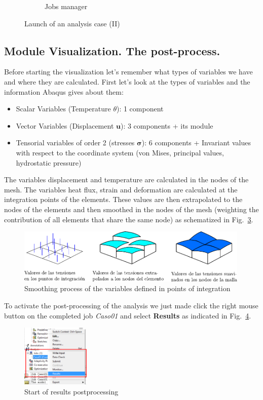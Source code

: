\begin{enumerate}
\begin{figure}[H]
\begin{subfigure}{0.49\textwidth}
      \caption{Jobs manager}
      \label{figu68}
    \end{subfigure}%
    \caption{Launch of an analysis case (II)}
  \end{figure}
\end{enumerate}
\newpage
\subsection{Module Visualization. The post-process.}

Before starting the visualization let's remember what types of
variables we have and where they are calculated. First let's look at
the types of variables and the information Abaqus gives about them:
\begin{itemize}
\item Scalar Variables (Temperature $\theta$): 1 component
\item Vector Variables (Displacement $\mathbf{u}$): 3 components + its
  module
\item Tensorial variables of order 2 (stresses $\bm{\sigma}$): 6
  components + Invariant values with respect to the coordinate system
  (von Mises, principal values, hydrostatic pressure)
\end{itemize}

The variables displacement and temperature are calculated in the nodes
of the mesh. The variables heat flux, strain and deformation are
calculated at the integration points of the elements. These values
are then extrapolated to the nodes of the elements and then smoothed
in the nodes of the mesh (weighting the contribution of all elements
that share the same node) as schematized in Fig.~\ref{figu69}.
\begin{figure}[!h]
  \centering
  \includegraphics[width=0.99\textwidth]{./body/images/imagen69}
  \caption{Smoothing process of the variables defined in points of
    integration}
  \label{figu69}
\end{figure}

To activate the post-processing of the analysis we just made click the
right mouse button on the completed job \textit{Caso01} and select
\textbf{Results} as indicated in Fig.~\ref{figu70}.
\begin{figure}[!h]
  \centering
  \includegraphics[width=0.29\textwidth]{./body/images/imagen70.pdf}
  \caption{Start of results postprocessing}
  \label{figu70}
\end{figure}

